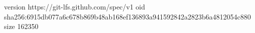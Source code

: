 version https://git-lfs.github.com/spec/v1
oid sha256:6915db077a6c678b869b48ab168ef136893a941592842a2823b6a4812054c880
size 162350
